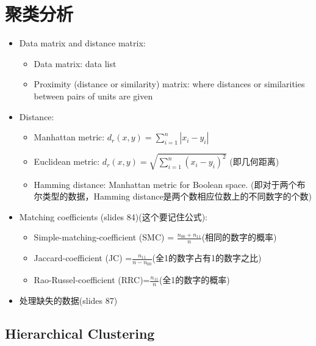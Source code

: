 \documentclass[12pt, a4paper, oneside]{ctexart}
\begin{document}
\section{聚类分析}
\begin{itemize}
    \item Data matrix and distance matrix:
    \begin{itemize}
        \item Data matrix: data list
        \item Proximity (distance or similarity) matrix: where distances or
        similarities between pairs of units are given
    \end{itemize}
    \item Distance:
    \begin{itemize}
        \item Manhattan metric: $d_r(x,y)=\sum_{i=1}^n|x_i-y_i|$
        \item Euclidean metric: $d_r(x,y)=\sqrt{\sum_{i=1}^n{(x_i-y_i)}^2}$ (即几何距离)
        \item Hamming distance: Manhattan metric for Boolean space. (即对于两个布尔类型的数据，Hamming distance是两个数相应位数上的不同数字的个数)
    \end{itemize}
    \item Matching coefficients (slides 84)(这个要记住公式):
    \begin{itemize}
        \item Simple-matching-coefficient (SMC) = $\frac{n_{00}+n_{11}}{n}$(相同的数字的概率)
        \item Jaccard-coefficient (JC) =$\frac{n_{11}}{n-n_{00}}$(全1的数字占有1的数字之比)
        \item Rao-Russel-coefficient (RRC)=$\frac{n_{11}}{n}$(全1的数字的概率)
    \end{itemize}
    \item 处理缺失的数据(slides 87)
\end{itemize}
\subsection{Hierarchical Clustering}
\end{document}
